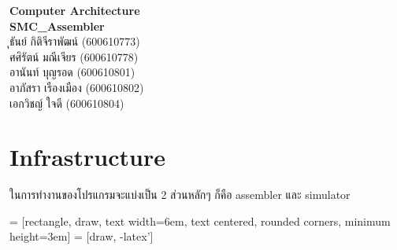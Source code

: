 \documentclass[14pt]{article}
\begin{document}
\begin{titlepage}
    \begin{center}
       \Large\textbf{Computer Architecture}\\
       \textbf{SMC\_Assembler}\\
       \vspace{2cm}
       ุธันย์ กิติจีราพัฒน์ (600610773) \\ ศศิรัตน์ มณีเจียร (600610778) \\ อานันท์ บุญรอด (600610801) \\ อาภัสรา เรืองเมือง (600610802) \\ เอกวิชญ์ ใจดี (600610804)

    \end{center}
 \end{titlepage}
\section{Infrastructure}
ในการทำงานของโปรแกรมจะแบ่งเป็น 2 ส่วนหลักๆ ก็คือ assembler และ simulator 
\begin{center}
     = [rectangle, draw, 
        text width=6em, text centered, rounded corners, minimum height=3em]
     = [draw, -latex']
    
    \end{center}
\end{document}

